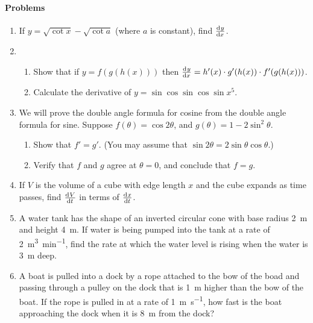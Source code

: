 \paragraph{Problems}
\begin{enumerate}
  \item If $ y = \sqrt{\cot x} - \sqrt{\cot a} $ (where $ a $ is constant), find $ \od{y}{x} $.
  \item
    \begin{enumerate}
      \item Show that if $ y = f(g(h(x))) $ then $ \od{y}{x} = h'(x) \cdot g'(h(x)) \cdot f'(g(h(x))) $.
      \item Calculate the derivative of $ y = \sin \cos \sin \cos \sin x^5 $.
    \end{enumerate}
  \item We will prove the double angle formula for cosine from the double angle formula for sine.
            Suppose $ f(\theta) = \cos 2\theta $, and $ g(\theta) =  1 - 2\sin^2 \theta $.
    \begin{enumerate}
      \item Show that $ f' = g' $. (You may assume that $ \sin 2\theta = 2\sin \theta \cos \theta $.)
      \item Verify that $ f $ and $ g $ agree at $ \theta = 0 $, and conclude that $ f = g $.
    \end{enumerate}
  \item If $ V $ is the volume of a cube with edge length $ x $ and the cube expands as time passes,
        find $ \od{V}{t} $ in terms of $ \od{x}{t} $.
  \item A water tank has the shape of an inverted circular cone with base radius \SI{2}{\metre}
        and height \SI{4}{\metre}. If water is being pumped into the tank at a rate of \SI{2}{\metre\cubed\per\minute},
        find the rate at which the water level is rising when the water is \SI{3}{\metre} deep.
  \item A boat is pulled into a dock by a rope attached to the bow of the boad and passing through a pulley on
        the dock that is \SI{1}{\metre} higher than the bow of the boat. If the rope is pulled in at a rate
        of \SI{1}{\metre\per\second}, how fast is the boat approaching the dock when it is \SI{8}{\metre} from the dock?
\end{enumerate}
